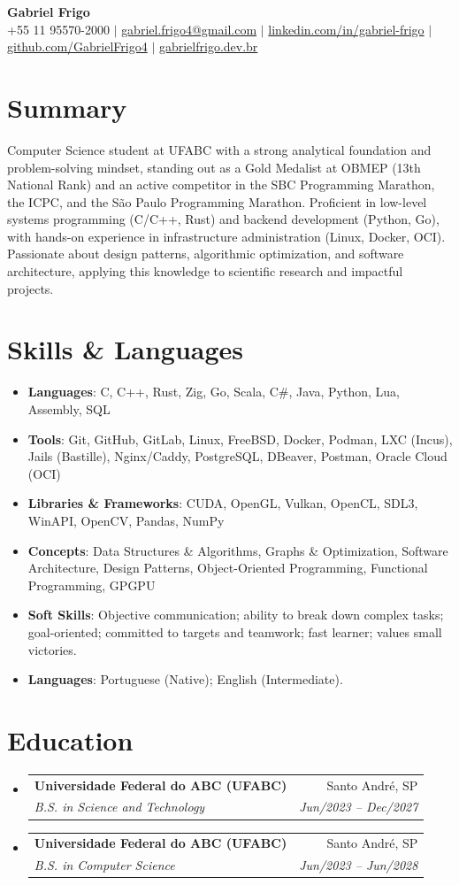 \documentclass[letterpaper,10pt]{article}
\makeatletter
\newcommand{\resumeItem}[1]{\item\small{#1}}
\newcommand{\resumeSubheading}[4]{
\vspace{-1pt}\item
  \begin{tabular*}{0.97\textwidth}[t]{l@{\extracolsep{\fill}}r}
    \textbf{#1} & #2 \\
    \textit{#3} & \textit{#4} \\
  \end{tabular*}\vspace{-7pt}
}
\newcommand{\resumeSubHeadingList}{\begin{itemize}[leftmargin=0.15in, label={}]}
\newcommand{\resumeSubHeadingListEnd}{\end{itemize}}
\makeatother
\begin{document}
\begin{center}
  \textbf{\Huge Gabriel Frigo} \\
  \small +55 11 95570-2000 $|$ \href{mailto:gabriel.frigo4@gmail.com}{gabriel.frigo4@gmail.com} $|$
  \href{https://linkedin.com/in/gabriel-frigo-b6727b275/}{linkedin.com/in/gabriel-frigo} $|$
  \href{https://github.com/GabrielFrigo4}{github.com/GabrielFrigo4} $|$
  \href{https://gabrielfrigo.dev.br}{gabrielfrigo.dev.br}
\end{center}

\section{Summary}
Computer Science student at UFABC with a strong analytical foundation and problem-solving mindset, standing out as a Gold Medalist at OBMEP (13th National Rank) and an active competitor in the SBC Programming Marathon, the ICPC, and the São Paulo Programming Marathon. Proficient in low-level systems programming (C/C++, Rust) and backend development (Python, Go), with hands-on experience in infrastructure administration (Linux, Docker, OCI). Passionate about design patterns, algorithmic optimization, and software architecture, applying this knowledge to scientific research and impactful projects.

\section{Skills \& Languages}
\resumeSubHeadingList
  \resumeItem{\textbf{Languages}: C, C++, Rust, Zig, Go, Scala, C\#, Java, Python, Lua, Assembly, SQL}
  \resumeItem{\textbf{Tools}: Git, GitHub, GitLab, Linux, FreeBSD, Docker, Podman, LXC (Incus), Jails (Bastille), Nginx/Caddy, PostgreSQL, DBeaver, Postman, Oracle Cloud (OCI)}
  \resumeItem{\textbf{Libraries \& Frameworks}: CUDA, OpenGL, Vulkan, OpenCL, SDL3, WinAPI, OpenCV, Pandas, NumPy}
  \resumeItem{\textbf{Concepts}: Data Structures \& Algorithms, Graphs \& Optimization, Software Architecture, Design Patterns, Object-Oriented Programming, Functional Programming, GPGPU}
  \resumeItem{\textbf{Soft Skills}: Objective communication; ability to break down complex tasks; goal-oriented; committed to targets and teamwork; fast learner; values small victories.}
  \resumeItem{\textbf{Languages}: Portuguese (Native); English (Intermediate).}
\resumeSubHeadingListEnd

\section{Education}
\resumeSubHeadingList
  \resumeSubheading
    {Universidade Federal do ABC (UFABC)}{Santo André, SP}
    {B.S. in Science and Technology}{Jun/2023 -- Dec/2027}
  \resumeSubheading
    {Universidade Federal do ABC (UFABC)}{Santo André, SP}
    {B.S. in Computer Science}{Jun/2023 -- Jun/2028}
\resumeSubHeadingListEnd
\end{document}
